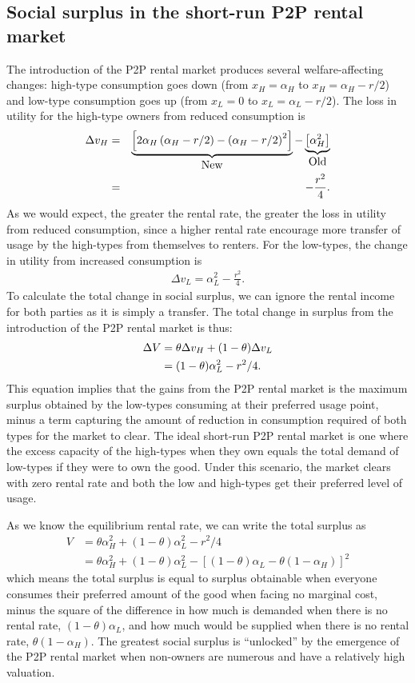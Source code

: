 \documentclass[11pt]{article}
\begin{document}
\subsection{Social surplus in the short-run P2P rental market}
The introduction of the P2P rental market produces several welfare-affecting changes: 
high-type consumption goes down (from $x_H = \alpha_H$ to  $x_H = \alpha_H - r/2$) and low-type consumption goes up (from $x_L = 0$ to $x_L = \alpha_L - r/2$). 
The loss in utility for the high-type owners from reduced consumption is 
\begin{eqnarray}
\Delta v_H &=& \underbrace{\left[2 \alpha_H \left(\alpha_H - r/2\right) - \left(\alpha_H - r/2\right)^2 \right]}_{\mbox{New}} - 
                             \underbrace{\left[\alpha_H^2 \right]}_{\mbox{Old}}   \notag \\
           &=& - \frac{r^2}{4}. 
\end{eqnarray} 
As we would expect, the greater the rental rate, the greater the loss in utility from reduced consumption, since a higher rental rate encourage more transfer of usage by the high-types from themselves to renters. 
For the low-types, the change in utility from increased consumption is
\begin{align}
\Delta v_L = \alpha_L^2 - \frac{r^2}{4}. 
\end{align} 
To calculate the total change in social surplus, we can ignore the rental income for both parties as it is simply a transfer. 
The total change in surplus from the introduction of the P2P rental market is thus: 
\begin{align}
\Delta V &= \theta \Delta v_H + (1-\theta) \Delta v_L \notag \\ 
         & = (1-\theta) \alpha_L^2 - r^2/4.
\end{align}
This equation implies that the gains from the P2P rental market is the maximum surplus obtained by the low-types consuming at their preferred usage point, minus a term capturing the amount of reduction in consumption required of both types for the market to clear.
The ideal short-run P2P rental market is one where the excess capacity of the high-types when they own equals the total demand of low-types if they were to own the good.
Under this scenario, the market clears with zero rental rate and both the low and high-types get their preferred level of usage. 

As we know the equilibrium rental rate, we can write the total surplus as
\begin{align}
  V & = \theta \alpha_H^2 + (1-\theta)\alpha_L^2 - r^2/4 \\
    & = \theta \alpha_H^2 + (1-\theta)\alpha_L^2 - \left[(1-\theta) \alpha_L - \theta (1-\alpha_H) \right]^2
\end{align} 
which means the total surplus is equal to surplus obtainable when everyone consumes their preferred amount of the good when facing no marginal cost, minus the square of the difference in how much is demanded when there is no rental rate, $(1-\theta)\alpha_L$, and how much would be supplied when there is no rental rate, $\theta (1-\alpha_H)$.
The greatest social surplus is ``unlocked'' by the emergence of the P2P rental market when non-owners are numerous and have a relatively high valuation. 
\end{document}
